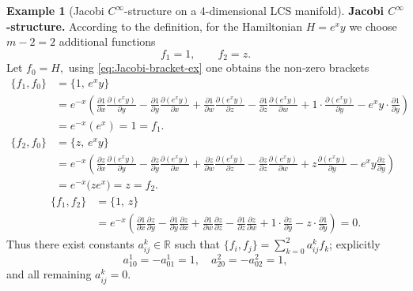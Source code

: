 \documentclass{article}
\theoremstyle{remark}
\theoremstyle{definition}
\newtheorem{example}{Example}[section]
\begin{document}
\begin{example}[Jacobi $C^\infty$-structure on a 4-dimensional LCS manifold]
\medskip\noindent
\textbf{Jacobi $C^\infty$-structure.}
According to the definition, for the Hamiltonian $H=e^xy$ we choose $m-2=2$ additional functions
\[
f_1 = 1,\qquad f_2 = z.
\]
Let $f_0=H,$ using \eqref{eq:Jacobi-bracket-ex} one obtains the non‑zero brackets
\begin{align}
\{f_1,f_0\} &= \{1,\, e^x y\} \nonumber \\
            &= e^{-x}\!\left( \frac{\partial 1}{\partial x}\frac{\partial (e^x y)}{\partial y}
            - \frac{\partial 1}{\partial y}\frac{\partial (e^x y)}{\partial x}
            + \frac{\partial 1}{\partial w}\frac{\partial (e^x y)}{\partial z}
            - \frac{\partial 1}{\partial z}\frac{\partial (e^x y)}{\partial w}  + 1\cdot\frac{\partial (e^x y)}{\partial y}
            - e^x y\cdot\frac{\partial 1}{\partial y} \right) \nonumber \\
            &= e^{-x}(e^x) = 1=f_1. \label{eq:bracket13calc}\\
\{f_2,f_0\} &= \{z,\, e^x y\} \nonumber \\
            &= e^{-x}\!\left( \frac{\partial z}{\partial x}\frac{\partial (e^x y)}{\partial y}
            - \frac{\partial z}{\partial y}\frac{\partial (e^x y)}{\partial x}
            + \frac{\partial z}{\partial w}\frac{\partial (e^x y)}{\partial z}
            - \frac{\partial z}{\partial z}\frac{\partial (e^x y)}{\partial w} + z\frac{\partial (e^x y)}{\partial y}
            - e^x y\frac{\partial z}{\partial y} \right) \nonumber \\
            &= e^{-x}\bigl(  z e^x\bigr) =  z=   f_2. \label{eq:bracket23calc}\end{align}
\begin{align}
            \{f_1,f_2\} &= \{1,\, z\} \nonumber \\
            &= e^{-x}\!\left( \frac{\partial 1}{\partial x}\frac{\partial z}{\partial y}
            - \frac{\partial 1}{\partial y}\frac{\partial z}{\partial x}
            + \frac{\partial 1}{\partial w}\frac{\partial z}{\partial z}
            - \frac{\partial 1}{\partial z}\frac{\partial z}{\partial w}+ 1\cdot\frac{\partial z}{\partial y}
            - z\cdot\frac{\partial 1}{\partial y} \right) = 0. \label{eq:bracket12calc}
\end{align}
Thus there exist constants $a_{ij}^{k}\in\mathbb{R}$ such that
$\{f_i,f_j\}=\sum_{k=0}^{2}a_{ij}^{k}f_k$; explicitly
\[
a_{10}^{1}=-a_{01}^1=1,\quad a_{20}^{2}=-a_{02}^2=1,
\]
and all remaining $a_{ij}^{k}=0$.




\end{example}
\end{document}
